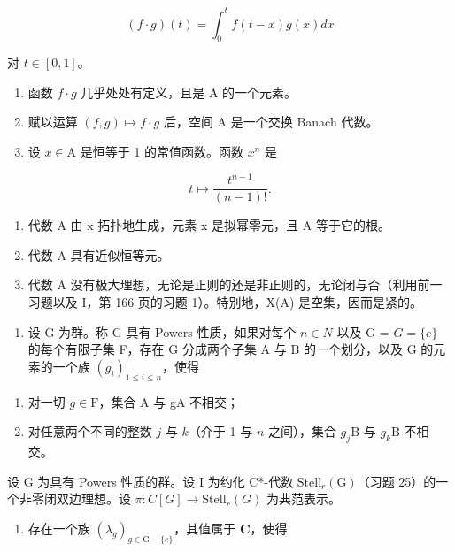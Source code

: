 \[
(f \cdot g) (t) = \int_ {0} ^ {t} f (t - x) g (x) d x
\]

对 \(t \in [0, 1]\)。

\begin{enumerate}
\def\labelenumi{\alph{enumi})}
\item
  函数 \(f \cdot g\) 几乎处处有定义，且是 A 的一个元素。
\item
  赋以运算 \((f,g)\mapsto f\cdot g\) 后，空间 A 是一个交换 Banach 代数。
\item
  设 \(x \in \mathrm{A}\) 是恒等于 1 的常值函数。函数 \(x^n\) 是
\end{enumerate}

\[
t \mapsto \frac {t ^ {n - 1}}{(n - 1) !}.
\]

\begin{enumerate}
\def\labelenumi{\alph{enumi})}
\setcounter{enumi}{3}
\item
  代数 A 由 x 拓扑地生成，元素 x 是拟幂零元，且 A 等于它的根。
\item
  代数 A 具有近似恒等元。
\item
  代数 A 没有极大理想，无论是正则的还是非正则的，无论闭与否（利用前一习题以及 I，第 166 页的习题 1）。特别地，X(A) 是空集，因而是紧的。
\end{enumerate}

\begin{enumerate}
\def\labelenumi{\arabic{enumi})}
\setcounter{enumi}{31}
\tightlist
\item
  设 G 为群。称 G 具有 Powers 性质，如果对每个 \(n \in N\) 以及 G = \(G = \{e\}\) 的每个有限子集 F，存在 G 分成两个子集 A 与 B 的一个划分，以及 G 的元素的一个族 \((g_i)_{1 \leqslant i \leqslant n}\)，使得
\end{enumerate}

\begin{enumerate}
\def\labelenumi{(\roman{enumi})}
\item
  对一切 \(g \in \mathrm{F}\)，集合 A 与 gA 不相交；
\item
  对任意两个不同的整数 \(j\) 与 \(k\)（介于 1 与 \(n\) 之间），集合 \(g_{j}\mathrm{B}\) 与 \(g_{k}\mathrm{B}\) 不相交。
\end{enumerate}

设 G 为具有 Powers 性质的群。设 I 为约化 C*-代数 \(\text{Stell}_{r}(\text{G})\)（习题 25）的一个非零闭双边理想。设 \(\pi: C[G] \to \text{Stell}_{r}(G)\) 为典范表示。

\begin{enumerate}
\def\labelenumi{\alph{enumi})}
\tightlist
\item
  存在一个族 \((\lambda_g)_{g\in \mathrm{G - }\{e\}}\)，其值属于 \(\mathbf{C}\)，使得
\end{enumerate}

